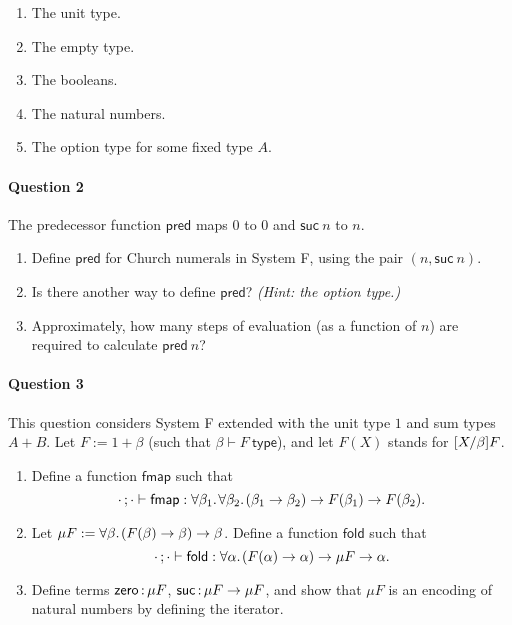 \documentclass[11pt,a4paper,twoside]{article}
\begin{document}
\begin{enumerate}[label=(\alph*)]
  \item The unit type.
  \item The empty type.
  \item The booleans.
  \item The natural numbers.
  \item The option type for some fixed type $A$.
\end{enumerate}

\paragraph{Question 2} The predecessor function $\mathsf{pred}$ maps $0$ to $0$ and $\mathsf{suc}\ n$ to $n$.

\begin{enumerate}[label=(\alph*)]
  \item Define $\mathsf{pred}$ for Church numerals in System F, using the pair $(n, \mathsf{suc}\ n)$.

  \item Is there another way to define $\mathsf{pred}$? \emph{(Hint: the option type.)}

  \item Approximately, how many steps of evaluation (as a function of $n$) are required to calculate $\mathsf{pred}\ n$?
\end{enumerate}

\paragraph{Question 3} This question considers System F extended with the unit type $1$ and sum types $A + B$.
Let $F := 1 + \beta$ (such that $\beta \vdash F\ \mathsf{type}$),
and let $F(X)$ stands for $[X / \beta] F$.

\begin{enumerate}[label=(\alph*)]
  \item Define a function $\mathsf{fmap}$ such that
  \[ \cdot\, ; \cdot \vdash \mathsf{fmap} : 
    \forall \beta_1 .\;\! \forall \beta_2 .\;\! (\beta_1 \to \beta_2) \to F(\beta_1) \to F(\beta_2). \]
  
  \item Let $\mu F := \forall \beta .\;\! (F(\beta) \to \beta) \to \beta$.
  Define a function $\mathsf{fold}$ such that
  \[ \cdot\, ; \cdot \vdash \mathsf{fold} : \forall \alpha .\;\! (F(\alpha) \to \alpha) \to \mu F \to \alpha.
  \]

  \item Define terms $\mathsf{zero} \,{:}\, \mu F$, $\mathsf{suc} \,{:}\, \mu F \to \mu F$,
  and show that $\mu F$ is an encoding of natural numbers
  by defining the iterator.
\end{enumerate}
\end{document}
